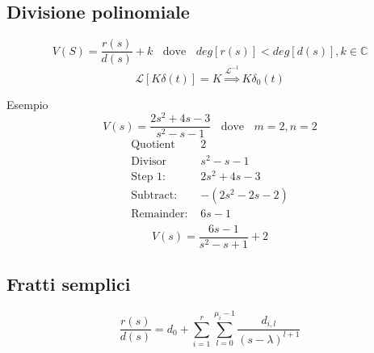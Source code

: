 \documentclass[a4paper]{article}
\begin{document}
\subsection{Divisione polinomiale}
\[V(S) = \frac{r(s)}{d(s)} + k \; \; \text{    dove    } \; \; deg[r(s)] < deg[d(s)], k \in \mathbb{C}\]
 \[\mathcal{L}[K\delta(t)] = K \stackrel{\mathcal{L}^{-1}}{\Longrightarrow} K\delta_0(t)\]
\begin{examplebox}{Esempio}
    \[V(s) = \frac{2s^2 + 4s - 3}{s^2 - s - 1} \; \; \text{ dove } \; \; m = 2, n=2\]
    \[
    \begin{array}{r|l}
    \text{Quotient} & 2 \\ \hline
    \text{Divisor} & s^2 - s - 1 \\
    \text{Step 1: } & 2s^2 + 4s - 3 \\
    \text{Subtract: } & -(2s^2 - 2s - 2) \\
    \text{Remainder: } & 6s - 1 \\
    \end{array}
    \]
    \[V(s) = \frac{6s - 1}{s^2 - s + 1} + 2\]
\end{examplebox}

\subsection{Fratti semplici}

\[\frac{r(s)}{d(s)} =  d_0 + \sum_{i=1}^{r} \sum_{l=0}^{\mu_i - 1} \frac{d_{i,l}}{(s-\lambda)^{l+1}}  \]
\end{document}
